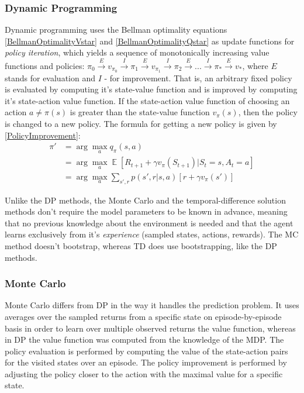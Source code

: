 \subsubsection{Dynamic Programming}
Dynamic programming uses the Bellman optimality equations \ref{BellmanOptimalityVstar} and \ref{BellmanOptimalityQstar} as update functions for \textit{policy iteration}, which yields a sequence of monotonically increasing value functions and policies: ${\pi}_{0}\overset{E}{\rightarrow}v_{{\pi}_{0}}\overset{I}{\rightarrow}{\pi}_{1}\overset{E}{\rightarrow}v_{{\pi}_{1}}\overset{I}{\rightarrow}{\pi}_{2}\overset{E}{\rightarrow}...\overset{I}{\rightarrow}{\pi}_{*}\overset{E}{\rightarrow}v_{*}$, where $E$ stands for evaluation and $I$ - for improvement. That is, an arbitrary fixed policy is evaluated by computing it's state-value function and is improved by computing it's state-action value function. If the state-action value function of choosing an action $a \neq \pi(s)$ is greater than the state-value function $v_{\pi}(s)$, then the policy is changed to a new policy. The formula for getting a new policy is given by \ref{PolicyImprovement}:
\begin{equation}\label{PolicyImprovement}
\begin{split}
\pi'&=\arg\!\max_{a}q_{\pi}(s,a)\\
&=\arg\!\max_{a}\mathop{{}\mathbb{E}}\left [ R_{t+1} + \gamma v_{\pi}(S_{t+1})|S_{t}=s, A_{t}=a  \right ] \\
&=\arg\!\max_{a}\sum_{s',r}p(s',r|s,a)\left [ r+\gamma v_{\pi}(s') \right ]
\end{split}
\end{equation}

Unlike the DP methods, the Monte Carlo and the temporal-difference solution methods don't require the model parameters to be known in advance, meaning that no previous knowledge about the environment is needed and that the agent learns exclusively from it's \textit{experience} (sampled states, actions, rewards). The MC method doesn't bootstrap, whereas TD does use bootstrapping, like the DP methods.

\subsubsection{Monte Carlo}
Monte Carlo differs from DP in the way it handles the prediction problem. It uses averages over the sampled returns from a specific state on episode-by-episode basis in order to learn over multiple observed returns the value function, whereas in DP the value function was computed from the knowledge of the MDP. The policy evaluation is performed by computing the value of the state-action pairs for the visited states over an episode. The policy improvement is performed by adjusting the policy closer to the action with the maximal value for a specific state.

